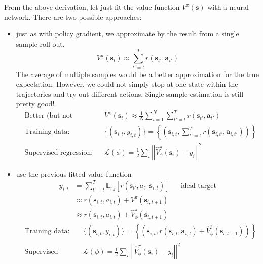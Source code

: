 From the above derivation, let just fit the value function $V^\pi(\textbf{s})$ with a neural network. There are two possible approaches:
\begin{itemize}
	\item {} just as with policy gradient, we approximate by the result from a single sample roll-out.
	\begin{equation}
		V^\pi(\textbf{s}_t) \approx \sum_{t'=t}^T r(\textbf{s}_{t'}, \textbf{a}_{t'})
	\end{equation}
	The average of multiple samples would be a better approximation for the true expectation. However, we could not simply stop at one state within the trajectories and try out different actions. Single sample estimation is still pretty good!
	\begin{align}
		&\text{Better (but not possible)} && V^\pi(\textbf{s}_t) \approx \frac{1}{N} \sum_{i=1}^N \sum_{t'=t}^T r(\textbf{s}_{t'}, \textbf{a}_{t'})\\
		&\text{Training data:} && \{(\textbf{s}_{i,t}, y_{i,t}) \} = \left\{\left(\textbf{s}_{i,t}, \sum_{t'=t}^T r(\textbf{s}_{i,t'}, \textbf{a}_{i,t'})\right)\right\}\\
		&\text{Supervised regression:} && \mathcal{L}(\phi) = \frac{1}{2} \sum_{i} \left|\left| \widehat{V}_{\phi}^{\pi}(\textbf{s}_i) - y_i\right|\right| ^2
	\end{align}
	\item {} use the previous fitted value function
	\begin{align}
		y_{i,t} &= \sum_{t'=t}^{T} \mathbb{E}_{\pi_{\theta}} [r(\textbf{s}_{t'}, a_{t'} | \textbf{s}_{i,t})] &&\text{ideal target}\\
		&\approx r(\textbf{s}_{i,t}, a_{i, t}) + V^{\pi}(\textbf{s}_{i,t+1})\\
		&\approx r(\textbf{s}_{i,t}, a_{i, t}) + \widehat{V}_{\phi}^{\pi}(\textbf{s}_{i,t+1})
	\end{align}
	\begin{align}
		&\text{Training data:} && \{(\textbf{s}_{i,t}, y_{i,t}) \} = \left\{\left(\textbf{s}_{i,t}, r(\textbf{s}_{i,t}, \textbf{a}_{i,t}) + \widehat{V}^\pi_\phi(\textbf{s}_{i,t+1}) \right)\right\}\\
		&\text{Supervised regression:} && \mathcal{L}(\phi) = \frac{1}{2} \sum_{i} \left|\left| \widehat{V}_{\phi}^{\pi}(\textbf{s}_i) - y_i\right|\right| ^2
	\end{align}	
\end{itemize}


